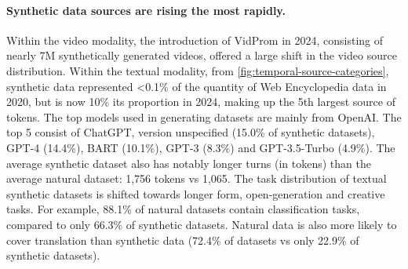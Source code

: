 \paragraph{Synthetic data sources are rising the most rapidly.}
Within the video modality, the introduction of VidProm \citep{wang2024vidprom} in 2024, consisting of nearly 7M synthetically generated videos, offered a large shift in the video source distribution.
Within the textual modality, from \cref{fig:temporal-source-categories}, synthetic data represented <0.1\% of the quantity of Web Encyclopedia data in 2020, but is now 10\% its proportion in 2024, making up the 5th largest source of tokens.
The top models used in generating datasets are mainly from OpenAI. The top 5 consist of ChatGPT, version unspecified (15.0\% of synthetic datasets), GPT-4 (14.4\%), BART (10.1\%), GPT-3 (8.3\%) and GPT-3.5-Turbo (4.9\%). 
The average synthetic dataset also has notably longer turns (in tokens) than the average natural dataset: 1,756 tokens vs 1,065.
The task distribution of textual synthetic datasets is shifted towards longer form, open-generation and creative tasks. For example, 88.1\% of natural datasets contain classification tasks, compared to only 66.3\% of synthetic datasets. Natural data is also more likely to cover translation than synthetic data (72.4\% of datasets vs only 22.9\% of synthetic datasets). 



